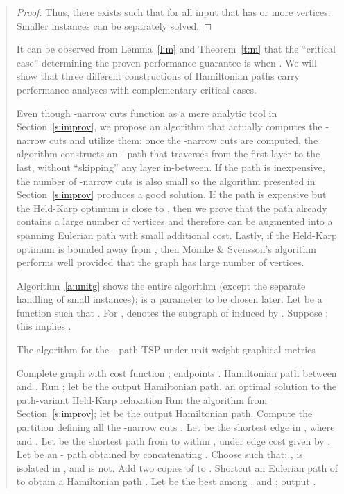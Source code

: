\documentclass[11pt,letterpaper]{article}
\newcommand{\st}{\mbox{-} }
\begin{document}
\begin{quote}
\begin{proof}
Thus, there exists  such that  for all input that has  or more vertices. Smaller instances can be separately solved.
\end{proof}

It can be observed from Lemma~\ref{l:m} and Theorem~\ref{t:m} that the ``critical case'' determining the proven performance guarantee is when . We will show that three different constructions of Hamiltonian paths carry performance analyses with complementary critical cases.

Even though -narrow cuts function as a mere analytic tool in Section~\ref{s:improv}, we propose an algorithm that actually computes the -narrow cuts and utilize them: once the -narrow cuts are computed, the algorithm constructs an \st path that traverses from the first layer to the last, without ``skipping'' any layer in-between. If the path is inexpensive, the number of -narrow cuts is also small so the algorithm presented in Section~\ref{s:improv} produces a good solution. If the path is expensive but the Held-Karp optimum is close to , then we prove that the path already contains a large number of vertices and therefore can be augmented into a spanning Eulerian path with small additional cost. Lastly, if the Held-Karp optimum is bounded away from , then M\"omke \& Svensson's algorithm performs well provided that the graph has large number of vertices.

Algorithm~\ref{a:unitg} shows the entire algorithm (except the separate handling of small instances);  is a parameter to be chosen later. Let  be a function such that . For ,  denotes the subgraph of  induced by . Suppose ; this implies .

\begin{algorithm}[ht]
\caption{The algorithm for the \st path TSP under unit-weight graphical metrics}
\label{a:unitg}
\begin{algorithmic}[1]
	\REQUIRE Complete graph  with cost function ; endpoints .
	\ENSURE Hamiltonian path between  and .
	\STATE Run ; let  be the output Hamiltonian path.
	\STATE an optimal solution to the path-variant Held-Karp relaxation
	\STATE Run the algorithm from Section~\ref{s:improv}; let  be the output Hamiltonian path.
	\STATE Compute the partition  defining all the -narrow cuts .\label{as:unitg:0}
	\FOR {}
	\STATE Let  be the shortest edge in , where  and .
	\ENDFOR
	\FOR {}
	\STATE Let  be the shortest path from  to  within , under edge cost given by .
	\ENDFOR
	\STATE Let  be an \st path obtained by concatenating .\hspace{-2em}
	\STATE 
	\label{as:unitg:1}
	\STATE Choose  such that: ,  is isolated in , and  is not.
	\STATE Add two copies of  to .
	\ENDWHILE \label{as:unitg:2}
	\STATE Shortcut an Eulerian path of  to obtain a Hamiltonian path .
	\STATE Let  be the best among ,  and ; output .
\end{algorithmic}
\end{algorithm}


\end{quote}
\end{document}
